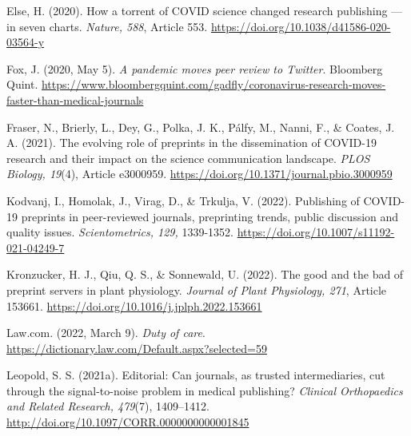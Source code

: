 \documentclass[authordate, perspective]{jote-new-article}
\begin{document}
	Else, H. (2020). How a torrent of COVID science changed research publishing — in seven charts. \emph{Nature, 588}, Article 553. \url{https://doi.org/10.1038/d41586-020-03564-y}







	Fox, J. (2020, May 5). \emph{A pandemic moves peer review to Twitter}. Bloomberg Quint. \url{https://www.bloombergquint.com/gadfly/coronavirus-research-moves-faster-than-medical-journals}







	Fraser, N., Brierly, L., Dey, G., Polka, J. K., Pálfy, M., Nanni, F., \& Coates, J. A. (2021). The evolving role of preprints in the dissemination of COVID-19 research and their impact on the science communication landscape. \emph{PLOS Biology, 19}(4), Article e3000959. \url{https://doi.org/10.1371/journal.pbio.3000959}







	Kodvanj, I., Homolak, J., Virag, D., \& Trkulja, V. (2022). Publishing of COVID-19 preprints in peer-reviewed journals, preprinting trends, public discussion and quality issues. \emph{Scientometrics, 129, }1339-1352. \url{https://doi.org/10.1007/s11192-021-04249-7}







	Kronzucker, H. J., Qiu, Q. S., \& Sonnewald, U. (2022). The good and the bad of preprint servers in plant physiology. \emph{Journal of Plant Physiology, 271}, Article 153661. \url{https://doi.org/10.1016/j.jplph.2022.153661}







	Law.com. (2022, March 9). \emph{Duty of care}. \url{https://dictionary.law.com/Default.aspx?selected=59}







	Leopold, S. S. (2021a). Editorial: Can journals, as trusted intermediaries, cut through the signal-to-noise problem in medical publishing? \emph{Clinical Orthopaedics and Related Research, 479}(7), 1409--1412. \url{http://doi.org/10.1097/CORR.0000000000001845}
\end{document}
